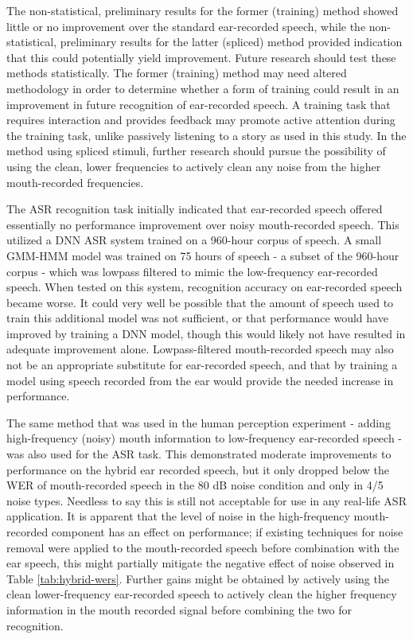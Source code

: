 The non-statistical, preliminary results for the former (training) method showed little or no improvement over the standard ear-recorded speech, while the non-statistical, preliminary results for the latter (spliced) method provided indication that this could potentially yield improvement.  Future research should test these methods statistically.  The former (training) method may need altered methodology in order to determine whether a form of training could result in an improvement in future recognition of ear-recorded speech.  A training task that requires interaction and provides feedback may promote active attention during the training task, unlike passively listening to a story as used in this study.  In the method using spliced stimuli, further research should pursue the possibility of using the clean, lower frequencies to actively clean any noise from the higher mouth-recorded frequencies.  

The ASR recognition task initially indicated that ear-recorded speech offered essentially no performance improvement over noisy mouth-recorded speech. This utilized a DNN ASR system trained on a 960-hour corpus of speech. A small GMM-HMM model was trained on 75 hours of speech - a subset of the 960-hour corpus - which was lowpass filtered to mimic the low-frequency ear-recorded speech.  When tested on this system, recognition accuracy on ear-recorded speech became worse.  It could very well be possible that the amount of speech used to train this additional model was not sufficient, or that performance would have improved by training a DNN model, though this would likely not have resulted in adequate improvement alone.  Lowpass-filtered mouth-recorded speech may also not be an appropriate substitute for ear-recorded speech, and that by training a model using speech recorded from the ear would provide the needed increase in performance.

The same method that was used in the human perception experiment - adding high-frequency (noisy) mouth information to low-frequency ear-recorded speech - was also used for the ASR task.  This demonstrated moderate improvements to performance on the hybrid ear recorded speech, but it only dropped below the WER of mouth-recorded speech in the 80 dB noise condition and only in 4/5 noise types.  Needless to say this is still not acceptable for use in any real-life ASR application.  It is apparent that the level of noise in the high-frequency mouth-recorded component has an effect on performance; if existing techniques for noise removal were applied to the mouth-recorded speech before combination with the ear speech, this might partially mitigate the negative effect of noise observed in Table \ref{tab:hybrid-wers}.  Further gains might be obtained by actively using the clean lower-frequency ear-recorded speech to actively clean the higher frequency information in the mouth recorded signal before combining the two for recognition.   

